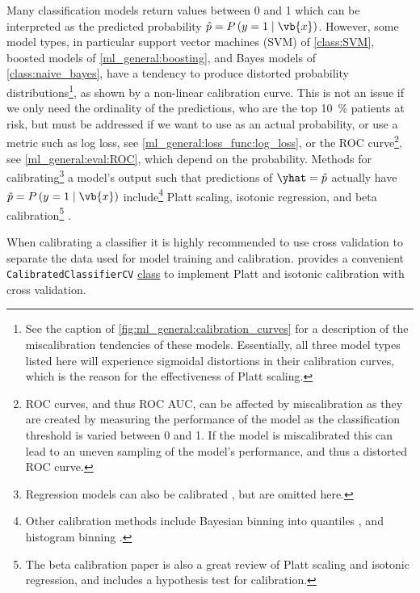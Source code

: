 Many classification models return \yhat values between \num{0} and \num{1}
which can be interpreted as the predicted probability $\hat{p} = P\left(y=1 \mid \vb{x}\right)$.
However, some model types, in particular
support vector machines (SVM) of \cref{class:SVM},
boosted models of \cref{ml_general:boosting},
and \naive Bayes models of \cref{class:naive_bayes},
have a tendency to produce distorted probability distributions\footnote{See
the caption of \cref{fig:ml_general:calibration_curves} for
a description of the miscalibration tendencies of these models.
Essentially, all three model types listed here will experience
sigmoidal distortions in their calibration curves,
which is the reason for the effectiveness of Platt scaling.},
as shown by a non-linear calibration curve.
This is not an issue if we only need the ordinality of the predictions,
\eg who are the top \SI{10}{\percent} patients at risk,
but must be addressed if we want to use \yhat as an actual probability,
or use a metric such as log loss, see \cref{ml_general:loss_func:log_loss},
or the ROC curve\footnote{ROC curves, and thus ROC AUC,
can be affected by miscalibration as they are created by measuring the performance of the model
as the classification threshold is varied between \num{0} and \num{1}.
If the model is miscalibrated this can lead to an uneven sampling of the model's performance,
and thus a distorted ROC curve.},
see \cref{ml_general:eval:ROC}, which depend on the probability.
Methods for calibrating\footnote{Regression models can also be calibrated \cite{10.1093/aje/154.9.836,1806.07690},
but are omitted here.} a model's output such that
predictions of $\yhat = \hat{p}$ actually have $\hat{p} = P\left(y=1 \mid \vb{x}\right)$
include\footnote{Other calibration methods include Bayesian binning into quantiles \cite{pmid25927013},
and histogram binning \cite{10.5555/645530.655658}.} Platt scaling,
isotonic regression,
and beta calibration\footnote{The beta calibration paper \cite{beta_calib}
is also a great review of Platt scaling and isotonic regression,
and includes a hypothesis test for calibration.} \cite{10.1145/1102351.1102430,1706.04599,beta_calib,2112.10327}.

When calibrating a classifier it is highly recommended to use cross validation
to separate the data used for model training and calibration.
\sklearn provides a convenient \texttt{CalibratedClassifierCV}
\href{https://scikit-learn.org/stable/modules/generated/sklearn.calibration.CalibratedClassifierCV.html}{class}
to implement Platt and isotonic calibration with cross validation.

